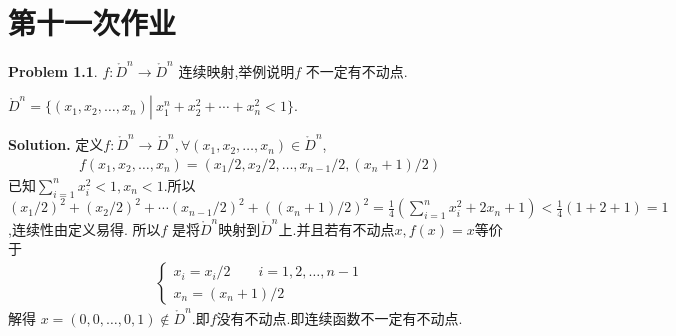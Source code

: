 \documentclass[a4paper]{book}
\makeatletter
\newenvironment{solution}%
{\noindent\textbf{Solution.}}%
{\qedhere}
\newcommand{\voidenvironment}[1]{%
  \expandafter\providecommand\csname env@#1@save@env\endcsname{}%
  \expandafter\providecommand\csname env@#1@process\endcsname{}%
  \@ifundefined{#1}{}{\RenewEnviron{#1}{}}%
}
\numberwithin{equation}{chapter}
\theoremstyle{definition}
\newtheorem{pro}[exm]{Problem}
\makeatother
\begin{document}
\pagestyle{empty}
% 



\setcounter{chapter}{10}




\chapter{第十一次作业}



\begin{pro}
  $f \colon \mathring{D}^n \rightarrow \mathring{D}^n $ 连续映射,举例说明$f$ 不一定有不动点.

  $\mathring{D}^n = \{ (x_1,x_2, \ldots , x_n) \left. \right| \ x_1^n + x_2^2 + \cdots + x_n^2 < 1\}$.
\end{pro}

\begin{solution}
  定义$f \colon \mathring{D}^n \rightarrow \mathring{D}^n,\forall (x_1, x_2,\ldots, x_n) \in \mathring{D}^n $,
  \begin{align*}
    f(x_1,x_2,\ldots, x_n) = (x_1/2,x_2/2,\ldots, x_{n-1}/2, (x_n + 1)/2) 
  \end{align*}
  已知$\sum\limits_{i=1}^n x_i^2 <1,  x_n < 1$.所以$(x_1/2)^2 + (x_2/2)^2 + \cdots (x_{n-1}/2)^2 + ((x_n + 1)/2)^2 = \frac{1}{4}(\sum\limits_{i=1}^n x_i^2 +2 x_n + 1) < \frac{1}{4}(1 + 2 + 1) = 1$,连续性由定义易得. 所以$f$ 是将$\mathring{D}^n$映射到$\mathring{D}^n$上.并且若有不动点$x, f(x) = x$等价于
  \begin{align*}
    \begin{cases}
      x_i = x_i/2 \qquad i=1,2,\ldots, n-1 \\
      x_n = (x_n + 1)/2
    \end{cases}
  \end{align*}
  解得 $x = (0,0,\ldots, 0, 1) \not\in \mathring{D}^n$.即$f$没有不动点.即连续函数不一定有不动点.
\end{solution}
\end{document}
